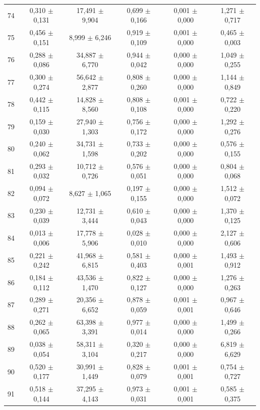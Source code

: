 \begin{tabular}{l c c c c c}
74 & 0,310 $\pm$ 0,131 & 17,491 $\pm$ 9,904 & 0,699 $\pm$ 0,166 & 0,001 $\pm$ 0,000 & 1,271 $\pm$ 0,717 \\
75 & 0,456 $\pm$ 0,151 & 8,999 $\pm$ 6,246 & 0,919 $\pm$ 0,109 & 0,001 $\pm$ 0,000 & 0,465 $\pm$ 0,003 \\
76 & 0,288 $\pm$ 0,086 & 34,887 $\pm$ 6,770 & 0,944 $\pm$ 0,042 & 0,000 $\pm$ 0,000 & 1,049 $\pm$ 0,255 \\
77 & 0,300 $\pm$ 0,274 & 56,642 $\pm$ 2,877 & 0,808 $\pm$ 0,260 & 0,000 $\pm$ 0,000 & 1,144 $\pm$ 0,849 \\
78 & 0,442 $\pm$ 0,115 & 14,828 $\pm$ 8,560 & 0,808 $\pm$ 0,108 & 0,001 $\pm$ 0,000 & 0,722 $\pm$ 0,220 \\
79 & 0,159 $\pm$ 0,030 & 27,940 $\pm$ 1,303 & 0,756 $\pm$ 0,172 & 0,000 $\pm$ 0,000 & 1,292 $\pm$ 0,276 \\
80 & 0,240 $\pm$ 0,062 & 34,731 $\pm$ 1,598 & 0,733 $\pm$ 0,202 & 0,000 $\pm$ 0,000 & 0,576 $\pm$ 0,155 \\
81 & 0,293 $\pm$ 0,032 & 10,712 $\pm$ 0,726 & 0,576 $\pm$ 0,051 & 0,000 $\pm$ 0,000 & 0,804 $\pm$ 0,068 \\
82 & 0,094 $\pm$ 0,072 & 8,627 $\pm$ 1,065 & 0,197 $\pm$ 0,155 & 0,000 $\pm$ 0,000 & 1,512 $\pm$ 0,072 \\
83 & 0,230 $\pm$ 0,039 & 12,731 $\pm$ 3,444 & 0,610 $\pm$ 0,043 & 0,000 $\pm$ 0,000 & 1,370 $\pm$ 0,125 \\
84 & 0,013 $\pm$ 0,006 & 17,778 $\pm$ 5,906 & 0,028 $\pm$ 0,010 & 0,000 $\pm$ 0,000 & 2,127 $\pm$ 0,606 \\
85 & 0,221 $\pm$ 0,242 & 41,968 $\pm$ 6,815 & 0,581 $\pm$ 0,403 & 0,000 $\pm$ 0,001 & 1,493 $\pm$ 0,912 \\
86 & 0,184 $\pm$ 0,112 & 43,536 $\pm$ 1,470 & 0,822 $\pm$ 0,127 & 0,000 $\pm$ 0,000 & 1,276 $\pm$ 0,263 \\
87 & 0,289 $\pm$ 0,271 & 20,356 $\pm$ 6,652 & 0,878 $\pm$ 0,059 & 0,001 $\pm$ 0,001 & 0,967 $\pm$ 0,646 \\
88 & 0,262 $\pm$ 0,065 & 63,398 $\pm$ 3,391 & 0,977 $\pm$ 0,014 & 0,000 $\pm$ 0,000 & 1,499 $\pm$ 0,266 \\
89 & 0,038 $\pm$ 0,054 & 58,311 $\pm$ 3,104 & 0,320 $\pm$ 0,217 & 0,000 $\pm$ 0,000 & 6,819 $\pm$ 6,629 \\
90 & 0,520 $\pm$ 0,177 & 30,991 $\pm$ 1,449 & 0,828 $\pm$ 0,079 & 0,001 $\pm$ 0,001 & 0,754 $\pm$ 0,727 \\
91 & 0,518 $\pm$ 0,144 & 37,295 $\pm$ 4,143 & 0,973 $\pm$ 0,031 & 0,001 $\pm$ 0,001 & 0,585 $\pm$ 0,375 \\

\end{tabular}
